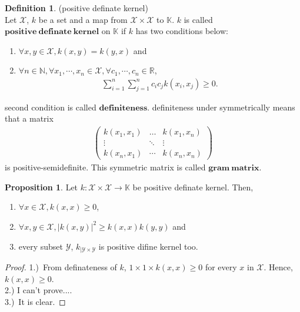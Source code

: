 \documentclass[11pt, a4paper, english, dvipdfmx]{jsarticle}
\theoremstyle{definition}
\newtheorem{Definition+}[Axiom+]{Definition}
\newtheorem{Proposition+}[Axiom+]{Proposition}
\newcommand{\N}{\mathbb{N}}
\newcommand{\R}{\mathbb{R}}
\newcommand{\K}{\mathbb{K}}
\newcommand{\X}{\mathcal{X}}
\newcommand{\Y}{\mathcal{Y}}
\begin{document}
\begin{Definition+}(positive definate kernel)\\
    Let $\X$, $k$ be a set and a map from $\X\times\X$ to $\K$.
    $k$ is called $\mathbf{positive~definate~kernel}$ on $\K$ if 
    $k$ has two conditions below:
    \begin{enumerate}
        \item $\forall x, y\in\X, k(x, y) = k(y, x)$ and
        \item $\forall n\in\N, \forall x_{1}, \cdots, x_{n}\in\X, \forall c_{1}, \cdots, c_{n}\in\R$,
              \begin{align*}
                  \sum_{i = 1}^{n}\sum_{j = 1}^{n}c_{i}c_{j}k(x_{i}, x_{j})\geq 0.
              \end{align*}
    \end{enumerate}
    second condition is called $\mathbf{definiteness}$. definiteness under symmetrically means that a matrix
    \begin{align*}
        \left(\begin{array}{ccc}
            {k\left(x_{1}, x_{1}\right)} & {\dots} & {k\left(x_{1}, x_{n}\right)} \\
            {\vdots} & {\ddots} & {\vdots} \\
            {k\left(x_{n}, x_{1}\right)} & {\cdots} & {k\left(x_{n}, x_{n}\right)}
        \end{array}\right)
    \end{align*}
    is positive-semidefinite. This symmetric matrix is called $\mathbf{gram~matrix}$.
\end{Definition+}
\begin{Proposition+}
    Let $k:\X\times\X\to\K$ be positive definate kernel. Then, 
    \begin{enumerate}
        \item $\forall x\in\X, k(x, x)\geq 0$,
        \item $\forall x, y\in\X, |k(x, y)|^2\geq k(x, x)k(y, y)$ and
        \item every subset $\Y$, $k_{|\Y\times\Y}$ is positive difine kernel too.
    \end{enumerate}
    \begin{proof}
        1.)~From definateness of $k$, $1\times 1\times k(x, x)\geq 0$ for every $x$ in $\X$. Hence, 
        $k(x, x)\geq 0$.\\
        2.) I can't prove....\\
        3.)~It is clear.
    \end{proof}
\end{Proposition+}
\end{document}
